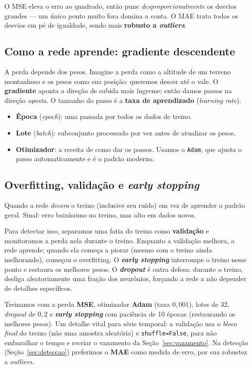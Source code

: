 \begin{intuicao}
O MSE eleva o erro ao quadrado, então pune \emph{desproporcionalmente} os
desvios grandes --- um único ponto muito fora domina a conta. O MAE trata todos
os desvios em pé de igualdade, sendo mais \textbf{robusto a \emph{outliers}}.
\end{intuicao}

\subsection{Como a rede aprende: gradiente descendente}
A perda depende dos pesos. Imagine a perda como a altitude de um terreno
montanhoso e os pesos como sua posição: queremos descer até o vale. O
\textbf{gradiente} aponta a direção de subida mais íngreme; então damos passos
na direção \emph{oposta}. O tamanho do passo é a \textbf{taxa de aprendizado}
(\emph{learning rate}).

\begin{itemize}[noitemsep]
  \item \textbf{Época} (\emph{epoch}): uma passada por todos os dados de treino.
  \item \textbf{Lote} (\emph{batch}): subconjunto processado por vez antes de
        atualizar os pesos.
  \item \textbf{Otimizador}: a receita de como dar os passos. Usamos o
        \texttt{Adam}, que ajusta o passo automaticamente e é o padrão moderno.
\end{itemize}

\subsection{Overfitting, validação e \emph{early stopping}}
\begin{definicao}[Overfitting]
Quando a rede \emph{decora} o treino (inclusive seu ruído) em vez de aprender o
padrão geral. Sinal: erro baixíssimo no treino, mas alto em dados novos.
\end{definicao}

Para detectar isso, separamos uma fatia do treino como \textbf{validação} e
monitoramos a perda nela durante o treino. Enquanto a validação melhora, a rede
aprende; quando ela começa a piorar (mesmo com o treino ainda melhorando), começou
o overfitting. O \textbf{\emph{early stopping}} interrompe o treino nesse ponto e
restaura os melhores pesos. O \textbf{\emph{dropout}} é outra defesa: durante o
treino, desliga aleatoriamente uma fração dos neurônios, forçando a rede a não
depender de detalhes específicos.

\begin{naprat}
Treinamos com a perda \textbf{MSE}, otimizador \textbf{Adam} (taxa $0{,}001$),
lotes de 32, \emph{dropout} de $0{,}2$ e \textbf{\emph{early stopping}} com
paciência de 10 épocas (restaurando os melhores pesos). Um detalhe vital para
série temporal: a validação usa o \emph{bloco final} do treino (não uma amostra
aleatória) e \texttt{shuffle=False}, para não embaralhar o tempo e recriar o
vazamento da Seção~\ref{sec:vazamento}. Na detecção (Seção~\ref{sec:deteccao})
preferimos o \textbf{MAE} como medida de erro, por sua robustez a \emph{outliers}.
\end{naprat}
